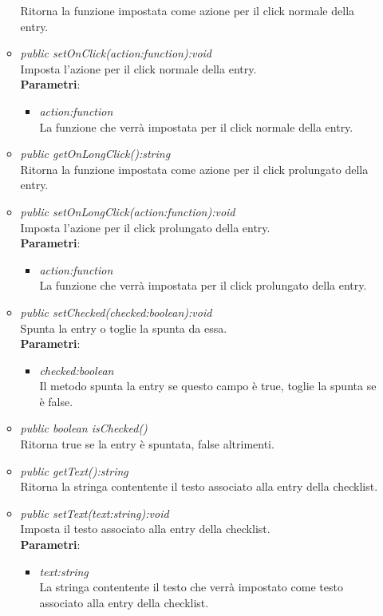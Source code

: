 \begin{itemize}
\begin{itemize}
	Ritorna la funzione impostata come azione per il click normale della entry.
	\item \textit{public setOnClick(action:function):void}\\
	Imposta l'azione per il click normale della entry.
		\\ \textbf{Parametri}: \begin{itemize}
		\item \textit{action:function}\\
		La funzione che verrà impostata per il click normale della entry.
		\end{itemize} 
	\item \textit{public getOnLongClick():string}\\
	Ritorna la funzione impostata come azione per il click prolungato della entry.	
	\item \textit{public setOnLongClick(action:function):void}\\
	Imposta l'azione per il click prolungato della entry.	
		\\ \textbf{Parametri}: \begin{itemize}
		\item \textit{action:function}\\
		La funzione che verrà impostata per il click prolungato della entry.
		\end{itemize} 
	\item \textit{public setChecked(checked:boolean):void}\\
	Spunta la entry o toglie la spunta da essa.
		\\ \textbf{Parametri}: \begin{itemize}
		\item \textit{checked:boolean}\\
		Il metodo spunta la entry se questo campo è true, toglie la spunta se è false.
		\end{itemize} 
	\item \textit{public boolean isChecked()}\\
	Ritorna true se la entry è spuntata, false altrimenti.
	\item \textit{public getText():string}\\
	Ritorna la stringa contentente il testo associato alla entry della checklist.
	\item \textit{public setText(text:string):void}\\
	Imposta il testo associato alla entry della checklist.
		\\ \textbf{Parametri}: \begin{itemize}
		\item \textit{text:string}\\
		La stringa contentente il testo che verrà impostato come testo associato alla entry della checklist.
		\end{itemize} 
	\end{itemize}
\end{itemize}

